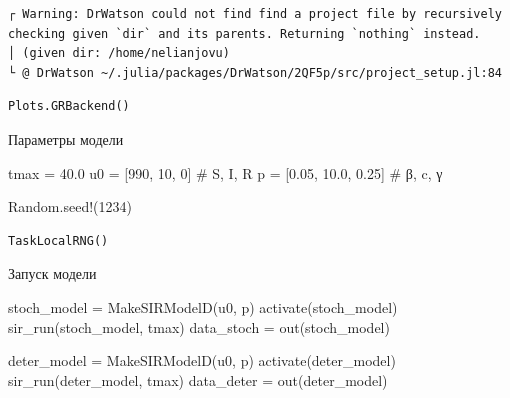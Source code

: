 \documentclass[
  12pt,
  a4paper,
  DIV=11,
  numbers=noendperiod]{scrreprt}
\newenvironment{Shaded}{\begin{snugshade}}{\end{snugshade}}
\newcommand{\BuiltInTok}[1]{\textcolor[rgb]{0.00,0.23,0.31}{#1}}
\newcommand{\CommentTok}[1]{\textcolor[rgb]{0.37,0.37,0.37}{#1}}
\newcommand{\FloatTok}[1]{\textcolor[rgb]{0.68,0.00,0.00}{#1}}
\newcommand{\FunctionTok}[1]{\textcolor[rgb]{0.28,0.35,0.67}{#1}}
\newcommand{\NormalTok}[1]{\textcolor[rgb]{0.00,0.23,0.31}{#1}}
\newcommand{\OperatorTok}[1]{\textcolor[rgb]{0.37,0.37,0.37}{#1}}
\begin{document}
\begin{verbatim}
┌ Warning: DrWatson could not find find a project file by recursively checking given `dir` and its parents. Returning `nothing` instead.
│ (given dir: /home/nelianjovu)
└ @ DrWatson ~/.julia/packages/DrWatson/2QF5p/src/project_setup.jl:84
\end{verbatim}

\begin{verbatim}
Plots.GRBackend()
\end{verbatim}

Параметры модели

\begin{Shaded}
\begin{Highlighting}[]
\NormalTok{tmax }\OperatorTok{=} \FloatTok{40.0}
\NormalTok{u0 }\OperatorTok{=}\NormalTok{ [}\FloatTok{990}\NormalTok{, }\FloatTok{10}\NormalTok{, }\FloatTok{0}\NormalTok{] }\CommentTok{\# S, I, R}
\NormalTok{p }\OperatorTok{=}\NormalTok{ [}\FloatTok{0.05}\NormalTok{, }\FloatTok{10.0}\NormalTok{, }\FloatTok{0.25}\NormalTok{] }\CommentTok{\# β, c, γ}

\BuiltInTok{Random}\NormalTok{.}\FunctionTok{seed!}\NormalTok{(}\FloatTok{1234}\NormalTok{)}
\end{Highlighting}
\end{Shaded}

\begin{verbatim}
TaskLocalRNG()
\end{verbatim}

Запуск модели

\begin{Shaded}
\begin{Highlighting}[]
\NormalTok{stoch\_model }\OperatorTok{=} \FunctionTok{MakeSIRModelD}\NormalTok{(u0, p)}
\FunctionTok{activate}\NormalTok{(stoch\_model)}
\FunctionTok{sir\_run}\NormalTok{(stoch\_model, tmax)}
\NormalTok{data\_stoch }\OperatorTok{=} \FunctionTok{out}\NormalTok{(stoch\_model)}

\NormalTok{deter\_model }\OperatorTok{=} \FunctionTok{MakeSIRModelD}\NormalTok{(u0, p)}
\FunctionTok{activate}\NormalTok{(deter\_model)}
\FunctionTok{sir\_run}\NormalTok{(deter\_model, tmax)}
\NormalTok{data\_deter }\OperatorTok{=} \FunctionTok{out}\NormalTok{(deter\_model)}
\end{Highlighting}
\end{Shaded}
\end{document}

